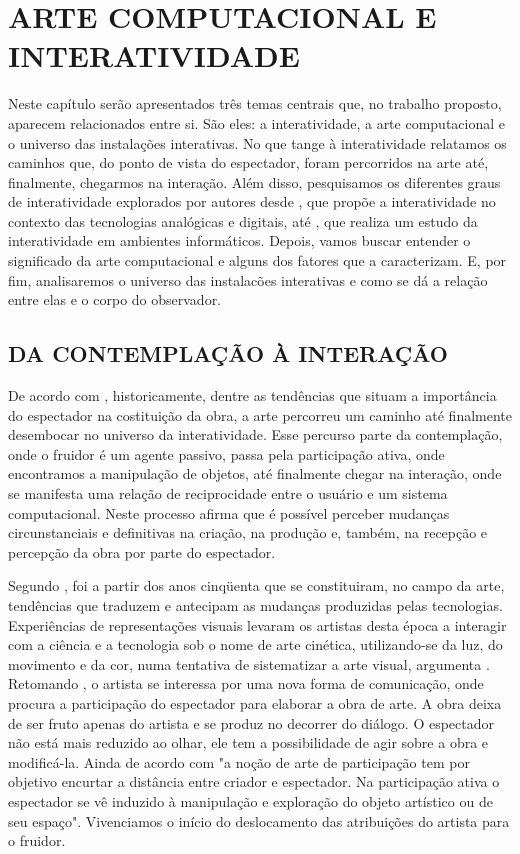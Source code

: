 \chapter{ARTE COMPUTACIONAL E INTERATIVIDADE}

Neste capítulo serão apresentados três temas centrais que, no trabalho proposto, aparecem relacionados entre si. São eles: a interatividade, a arte computacional e o universo das instalações interativas. No que tange à interatividade relatamos os caminhos que, do ponto de vista do espectador, foram percorridos na arte até, finalmente, chegarmos na interação. Além disso, pesquisamos os diferentes graus de interatividade explorados por autores desde , que propõe a interatividade no contexto das tecnologias analógicas e digitais, até  , que realiza um estudo da interatividade em ambientes informáticos. Depois, vamos buscar entender o significado da arte computacional e alguns dos fatores que a caracterizam. E, por fim, analisaremos o universo das instalacões interativas e como se dá a relação entre elas e o corpo do observador.




\section{DA CONTEMPLAÇÃO À INTERAÇÃO}

De acordo com , historicamente, dentre as tendências que situam a importância do espectador na costituição da obra, a arte percorreu um caminho até finalmente desembocar no universo da interatividade. Esse percurso parte da contemplação, onde o fruidor é um agente passivo, passa pela participação ativa, onde encontramos a manipulação de objetos, até finalmente chegar na interação, onde se manifesta uma relação de reciprocidade entre o usuário e um sistema computacional. Neste processo  afirma que é possível perceber mudanças circunstanciais e definitivas na criação, na produção e, também, na recepção e percepção da obra por parte do espectador. 

Segundo , foi a partir dos anos cinqüenta que se constituiram, no campo da arte, tendências que traduzem e antecipam as mudanças produzidas pelas tecnologias. Experiências de representações visuais levaram os artistas desta época a interagir com a ciência e a tecnologia sob o nome de arte cinética, utilizando-se da luz, do movimento e da cor, numa tentativa de sistematizar a arte visual, argumenta . Retomando , o artista se interessa por uma nova forma de comunicação, onde procura a participação do espectador para elaborar a obra de arte. A obra deixa de ser fruto apenas do artista e se produz no decorrer do diálogo. O espectador não está mais reduzido ao olhar, ele tem a possibilidade de agir sobre a obra e modificá-la. Ainda de acordo com  "a noção de arte de participação tem por objetivo encurtar a distância entre criador e espectador. Na participação ativa o espectador se vê induzido à manipulação e exploração do objeto artístico ou de seu espaço". Vivenciamos o início do deslocamento das atribuições do artista para o fruidor. 

